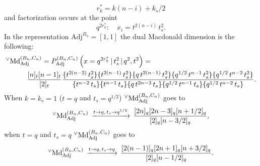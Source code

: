 \documentclass{article}
\def\nn{\nonumber}
\def\MD{\hbox{Md}}%
\def\MD{\hbox{Md}}%
\def\MDv{{^\vee\hbox{Md}}}
\def\Adj{\text{Adj}}
\def\nn{\nonumber}
\begin{document}
\begin{equation}
    r_k^* = k (n-i)+k_s/2
\end{equation}
and factorization occurs at the point
\begin{equation}
    q^{2r_k^*}: \quad x_i = t^{2(n-i)}\, t_s^2.
\end{equation}
In the representation $\Adj^{B_n} = [1,1]$ the dual Macdonald dimension is the following:
\begin{align}
& \MDv_{\Adj}^{(B_n,C_n)}=P_{\Adj}^{(B_n,C_n)}\left(x = q^{2r_k^*}\,|\, t_s^2\,|\,q^2,t^2 \right) =  \\
&  \nn \quad\quad\quad
    \frac{[n]_t[n-1]_t}{[2]_t}
    \frac{\{t^{2(n-2)}\,t_s^2 \}\{t^{2(n-1)}\,t_s^2 \}\{q\,t^{2(n-1)}\,t_s^2 \}\{q^{1/2}\,t^{n-1}\,t_s^2 \}\{q^{1/2}\,t^{n-2}\,t_s^2 \}}{\{t^{n-2}\, t_s\}\{ t^{n-1}\, t_s\}\{ q\,t^{2n-3}\, t_s\}\{ q^{1/2}\,t^{n-1}\, t_s\}\{ q^{1/2}\,t^{n-2}\, t_s\}}.
\end{align}
 When $k=k_s=1$ ($t=q$ and $t_s=q^{1/2}$) $^{\vee}\MD_{\Adj}^{(B_n,C_n)}$ goes to
 \begin{equation}
     ^{\vee}\MD_{\Adj}^{(B_n,C_n)}\,\xrightarrow[]{t\rightarrow q,\, t_s \rightarrow q^{1/2}} \, \frac{[2n]_q[2n-3]_q [n+1/2]_q}{[2]_q[n-3/2]_q},
\end{equation}
when $t=q$ and $t_s=q$ $ \MDv_{\Adj}^{(B_n,C_n)}$ goes to
\begin{equation}
    \MDv_{\Adj}^{(B_n,C_n)}\,\xrightarrow[]{t\rightarrow q,\, t_s \rightarrow q} \, \frac{[2(n-1)]_q[2n+1]_q [n+3/2]_q}{[2]_q[n-1/2]_q}.
\end{equation}
\end{document}
